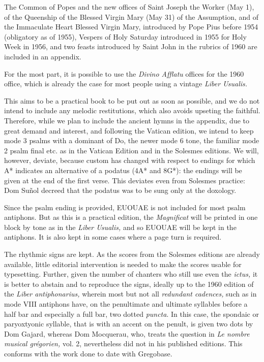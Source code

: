 \begin{enpars}
The Common of Popes and the new offices of Saint Joseph the Worker (May 1), of the Queenship of the Blessed Virgin Mary (May 31) of the Assumption, and of the Immaculate Heart Blessed Virgin Mary, introduced by Pope Pius  before 1954 (obligatory as of 1955), Vespers of Holy Saturday introduced in 1955 for Holy Week in 1956, and two feasts introduced by Saint John  in the rubrics of 1960 are included in an appendix.

For the most part, it is possible to use the \textit{Divino Afflatu} offices for the 1960 office, which is already the case for most people using a vintage \textit{Liber Usualis.}

This aims to be a practical book to be put out as soon as possible, and we do not intend to include any melodic restitutions, which also avoids upseting the faithful. Therefore, while we plan to include the ancient hymns in the appendix, due to great demand and interest, and following the Vatican edition, we intend to keep mode 3 psalms with a dominant of Do, the newer mode 6 tone, the familiar mode 2 psalm final etc. as in the Vatican Edition and in the Solesmes editions. We will, however, deviate, because custom has changed with respect to endings for which A* indicates an alternative of a podatus (4A* and 8G*): the endings will be given at the end of the first verse. This deviates even from Solesmes practice: Dom Suñol decreed that the podatus was to be sung only at the doxology.

Since the psalm ending is provided, EUOUAE is not included for most psalm antiphons. But as this is a practical edition, the \textit{Magnificat} will be printed in one block by tone as in the \textit{Liber Usualis,} and so EUOUAE will be kept in the antiphons. It is also kept in some cases where a page turn is required.

The rhythmic signs are kept. As the scores from the Solesmes editions are already available, little editorial intervention is needed to make the scores usable for typesetting. Further, given the number of chanters who still use even the \textit{ictus,}  it is better to abstain and to reproduce the signs, ideally up to the 1960 edition of the \textit{Liber antiphonarius,} wherein most but not all \textit{redundant cadences,} such as in mode VIII antiphons have, on the penultimate and ultimate syllables before a half bar and especially a full bar, two dotted \textit{puncta}. In this case, the spondaic or paryoxtyonic syllable, that is with an accent on the penult, is given two dots by Dom Gajard, whereas Dom Mocquerau, who, treats the question in \textit{Le nombre musical grégorien,} vol. 2, nevertheless did not in his published editions. This conforms with the work done to date with Gregobase.


\end{enpars}
